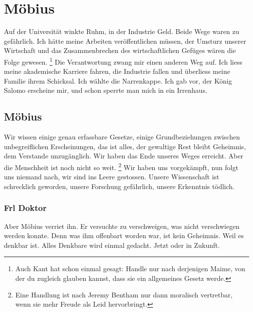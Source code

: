 \documentclass[a4 paper]{article}
\begin{document}
\section{Möbius} 

    Auf der Universität winkte Ruhm, in der Industrie Geld. Beide Wege waren zu
    gefährlich. Ich hätte meine Arbeiten veröffentlichen müssen, der Umsturz unserer Wirtschaft und das Zusammenbrechen des wirtschaftlichen Gefüges wären die Folge gewesen.
        \footnote{Auch Kant hat schon einmal gesagt: Handle nur nach derjenigen Maime, von der du zugleich glauben kannst, dass sie ein allgemeines Gesetz werde.} 
    Die Verantwortung zwang mir einen anderen Weg auf. Ich liess meine akademische Karriere fahren, die Industrie fallen und überliess meine Familie ihrem Schicksal. Ich wählte die Narrenkappe. Ich gab vor, der König Salomo erscheine mir, und schon sperrte man mich in ein Irrenhaus. 

\subsection{Möbius} \label{Möbius} 

    Wir wissen einige genau erfassbare Gesetze, einige Grundbeziehungen zwischen unbegreiflichen Erscheinungen, das ist alles, der gewaltige Rest bleibt Geheimnis, dem Verstande unzugänglich. Wir haben das Ende unseres Weges erreicht. Aber die Menschheit ist noch nicht so weit.
        \footnote{Eine Handlung ist nach Jeremy Bentham nur dann moralisch vertretbar, wenn sie mehr Freude als Leid hervorbringt.}
    Wir haben uns vorgekämpft, nun folgt uns niemand nach, wir sind ins Leere gestossen. Unsere Wissenschaft ist schrecklich geworden, unsere Forschung gefährlich, unsere Erkenntnis tödlich.
    
\subsubsection{Frl Doktor} \label{Frl Doktor} 

    Aber Möbius verriet ihn. Er versuchte zu verschweigen, was nicht verschwiegen werden konnte. Denn was ihm offenbart worden war, ist kein Geheimnis. Weil es denkbar ist. Alles Denkbare wird einmal gedacht. Jetzt oder in Zukunft. 
\end{document}
